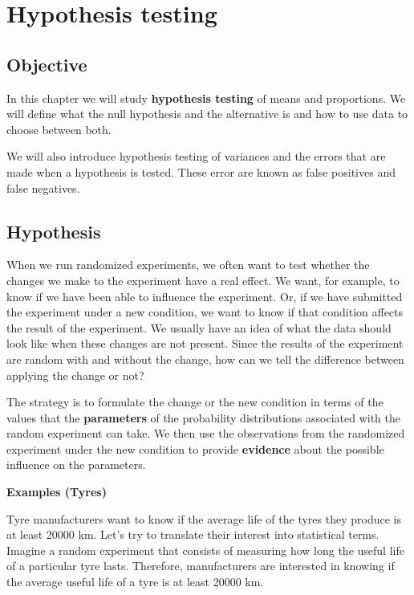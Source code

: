 \documentclass[
]{book}
\begin{document}
\hypertarget{hypothesis-testing}{%
\chapter{Hypothesis testing}\label{hypothesis-testing}}

\hypertarget{objective-10}{%
\section{Objective}\label{objective-10}}

In this chapter we will study \textbf{hypothesis testing} of means and proportions. We will define what the null hypothesis and the alternative is and how to use data to choose between both.

We will also introduce hypothesis testing of variances and the errors that are made when a hypothesis is tested. These error are known as false positives and false negatives.

\hypertarget{hypothesis}{%
\section{Hypothesis}\label{hypothesis}}

When we run randomized experiments, we often want to test whether the changes we make to the experiment have a real effect. We want, for example, to know if we have been able to influence the experiment. Or, if we have submitted the experiment under a new condition, we want to know if that condition affects the result of the experiment. We usually have an idea of what the data should look like when these changes are not present. Since the results of the experiment are random with and without the change, how can we tell the difference between applying the change or not?

The strategy is to formulate the change or the new condition in terms of the values that the \textbf{parameters} of the probability distributions associated with the random experiment can take. We then use the observations from the randomized experiment under the new condition to provide \textbf{evidence} about the possible influence on the parameters.

\textbf{Examples (Tyres)}

Tyre manufacturers want to know if the average life of the tyres they produce is at least 20000 km. Let's try to translate their interest into statistical terms. Imagine a random experiment that consists of measuring how long the useful life of a particular tyre lasts. Therefore, manufacturers are interested in knowing if the average useful life of a tyre is at least 20000 km.
\end{document}
